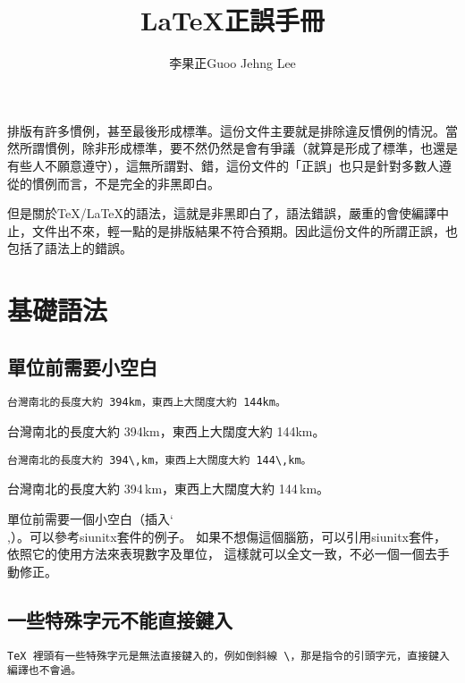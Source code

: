 \documentclass[11pt,a4paper]{article}
\title{\textsf{\textbf{\LaTeX 正誤手冊}}}
\author{李果正Guoo Jehng Lee}
\date{\zhtoday}
\begin{document}
\maketitle

排版有許多慣例，甚至最後形成標準。這份文件主要就是排除違反慣例的情況。當然所謂慣例，除非形成標準，要不然仍然是會有爭議（就算是形成了標準，也還是有些人不願意遵守），這無所謂對、錯，這份文件的「正誤」也只是針對多數人遵從的慣例而言，不是完全的非黑即白。

但是關於\TeX/\LaTeX 的語法，這就是非黑即白了，語法錯誤，嚴重的會使編譯中止，文件出不來，輕一點的是排版結果不符合預期。因此這份文件的所謂正誤，也包括了語法上的錯誤。

\section{基礎語法}
\label{sec:syntax}

\subsection{單位前需要小空白}
\label{sub:unit}

\begin{Wrong}
\begin{verbatim}
台灣南北的長度大約 394km，東西上大闊度大約 144km。
\end{verbatim}

台灣南北的長度大約 394km，東西上大闊度大約 144km。
\end{Wrong}

\begin{Right}
\begin{verbatim}
台灣南北的長度大約 394\,km，東西上大闊度大約 144\,km。
\end{verbatim}

台灣南北的長度大約 394\,km，東西上大闊度大約 144\,km。
\end{Right}

單位前需要一個小空白（插入\char`\\,）。可以參考{\sf siunitx}套件的例子。
如果不想傷這個腦筋，可以引用{\sf siunitx}套件，依照它的使用方法來表現數字及單位，
這樣就可以全文一致，不必一個一個去手動修正。

\subsection{一些特殊字元不能直接鍵入}
\label{sub:special}

\begin{Wrong}
\begin{verbatim}
TeX 裡頭有一些特殊字元是無法直接鍵入的，例如倒斜線 \，那是指令的引頭字元，直接鍵入編譯也不會過。
\end{verbatim}
\end{Wrong}
\end{document}
